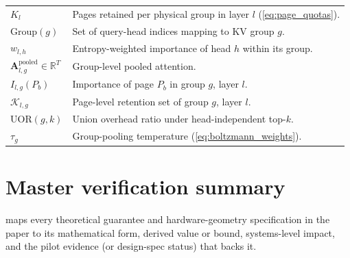 \documentclass[final,5p,times,twocolumn]{elsarticle}
\theoremstyle{definition}
\theoremstyle{remark}
\newcommand{\AttnPool}[2]{\mathbf{A}^{\mathrm{pooled}}_{#1,#2}}
\newcommand{\UOR}{\mathrm{UOR}}
\newcommand{\Group}[1]{\mathrm{Group}(#1)}
\newcommand{\RetSet}[2]{\mathcal{K}_{#1,#2}}
\newcommand{\PageImp}[3]{I_{#1,#2}(P_{#3})}
\begin{document}
\begin{table}[t]
\begin{tabularx}{\textwidth}{@{} l X @{}}
 $K_l$ & Pages retained per physical group in layer $l$   (\cref{eq:page_quotas}). \\
 $\Group{g}$ & Set of query-head indices mapping to KV group $g$. \\
 $w_{l,h}$ & Entropy-weighted importance of head $h$ within its group. \\
 $\AttnPool{l}{g}\in\mathbb{R}^T$ & Group-level pooled attention. \\
 $\PageImp{l}{g}{b}$ & Importance of page $P_b$ in group $g$, layer $l$. \\
 $\RetSet{l}{g}$ & Page-level retention set of group $g$, layer $l$. \\
 $\UOR(g,k)$ & Union overhead ratio under head-independent top-$k$. \\
 $\tau_g$ & Group-pooling temperature (\cref{eq:boltzmann_weights}). \\
\bottomrule
\end{tabularx}
\end{table}

\section{Master verification summary}
\label{app:verification}

 maps every theoretical guarantee
and hardware-geometry specification in the paper to its mathematical
form, derived value or bound, systems-level impact, and the pilot
evidence (or design-spec status) that backs it.
\end{document}
